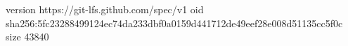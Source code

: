 version https://git-lfs.github.com/spec/v1
oid sha256:5fc23288499124ec74da233dbf0a0159d441712de49eef28e008d51135cc5f0c
size 43840
